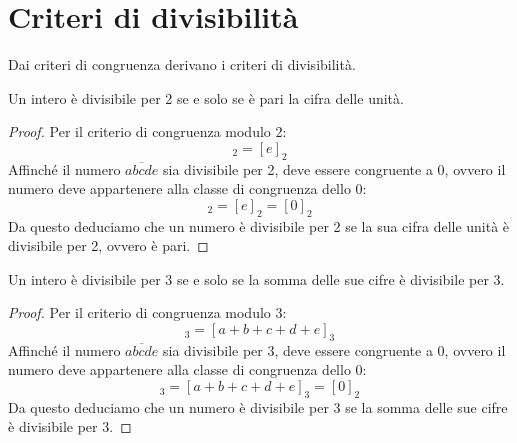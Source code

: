 \section{Criteri di divisibilità}

Dai criteri di congruenza derivano i criteri di divisibilità.

\begin{mdframed}
    \begin{teorema}
        Un intero è divisibile per 2 se e solo se è pari la cifra delle unità.
    \end{teorema}
    \begin{proof}
        Per il criterio di congruenza modulo 2:
        \begin{equation*}
            [\overline{abcde}]_2 = [e]_2
        \end{equation*}
        Affinché il numero $\overline{abcde}$ sia divisibile per 2, deve essere congruente a 0, ovvero il numero deve appartenere alla classe di congruenza dello 0:
        \begin{equation*}
            [\overline{abcde}]_2 = [e]_2 = [0]_2
        \end{equation*}
        Da questo deduciamo che un numero è divisibile per 2 se la sua cifra delle unità è divisibile per 2, ovvero è pari.
    \end{proof}
\end{mdframed}

\begin{mdframed}
    \begin{teorema}
        Un intero è divisibile per 3 se e solo se la somma delle sue cifre è divisibile per 3.
    \end{teorema}
    \begin{proof}
        Per il criterio di congruenza modulo 3:
        \begin{equation*}
            [\overline{abcde}]_3 = [a + b + c + d + e]_3
        \end{equation*}
        Affinché il numero $\overline{abcde}$ sia divisibile per 3, deve essere congruente a 0, ovvero il numero deve appartenere alla classe di congruenza dello 0:
        \begin{equation*}
            [\overline{abcde}]_3 = [a + b + c + d + e]_3 = [0]_2
        \end{equation*}
        Da questo deduciamo che un numero è divisibile per 3 se la somma delle sue cifre è divisibile per 3.
    \end{proof}
\end{mdframed}


